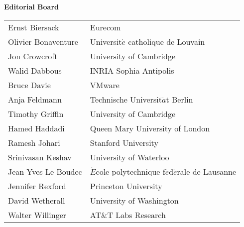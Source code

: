 \documentclass[a4paper,16pt]{article}
\begin{document}
\begin{center}
{\Huge \textbf{Editorial Board}}


\Large 
\vspace{1in}
\begin{tabular}{ll}
Ernst Biersack &	Eurecom \\
Olivier Bonaventure &	Universit$\acute{e}$ catholique de Louvain \\
Jon Crowcroft	&  University of Cambridge \\
Walid Dabbous	  & INRIA Sophia Antipolis \\
Bruce Davie	& VMware \\
Anja Feldmann	& Technische Universit$\ddot{a}$t Berlin\\
Timothy Griffin	& University of Cambridge \\
Hamed Haddadi &	Queen Mary University of London\\
Ramesh Johari	 & Stanford University\\
Srinivasan Keshav &	University of Waterloo\\
Jean-Yves Le Boudec	& $\acute{E}$cole polytechnique f$\acute{e}$d$\acute{e}$rale de Lausanne\\
Jennifer Rexford &	Princeton University\\
David Wetherall	& University of Washington\\
Walter Willinger	& AT\&T Labs Research\\
\end{tabular}
\end{center}


\newpage
\end{document}
